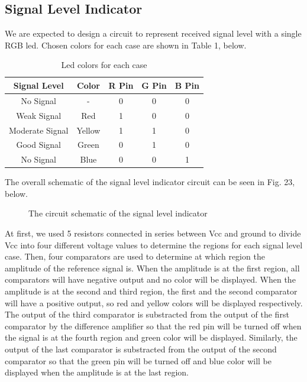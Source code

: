 \documentclass[conference]{IEEEtran}
\begin{document}
\subsection{Signal Level Indicator}
We are expected to design a circuit to represent received signal level with a single RGB led. Chosen colors for 
each case are shown in Table 1, below.
\begin{table}[htbp]
    \caption{Led colors for each case}
    \begin{center}
    \begin{tabular}{|c|c|c|c|c|}
    \hline
    \textbf{Signal Level} & \textbf{Color}& \textbf{R Pin}& \textbf{G Pin}& \textbf{B Pin} \\
    \hline
    No Signal & - & 0 & 0 & 0\\
    \hline
    Weak Signal & Red & 1 & 0 & 0\\
    \hline
    Moderate Signal & Yellow & 1 & 1 & 0\\
    \hline
    Good Signal & Green & 0 & 1 & 0\\
    \hline
    No Signal & Blue & 0 & 0 & 1\\
    \hline
    \end{tabular}
    \label{tab1}
    \end{center}
\end{table}
\par The overall schematic of the signal level indicator circuit can be seen in Fig. 23, below.
\begin{figure}[H]
   \centerline{}
    \caption{The circuit schematic of the signal level indicator}
\end{figure}
\par At first, we used 5 resistors connected in series between Vcc and ground to divide Vcc into four different voltage values
to determine the regions for each signal level case. 
Then, four comparators are used to determine at which region the amplitude of the reference signal is. When the amplitude 
is at the first region, all comparators will have negative output and no color will be displayed. When the amplitude 
is at the second and third region, the first and the second comparator will have a positive output, so red and yellow 
colors will be displayed respectively. The output of the third comparator is substracted from the output of the first 
comparator by the difference amplifier so that the red pin will be turned off when the signal is at the fourth region 
and green color will be displayed. Similarly, the output of the last comparator is substracted from the output of the 
second comparator so that the green pin will be turned off and blue color will be displayed when the amplitude is at the 
last region.
\end{document}
